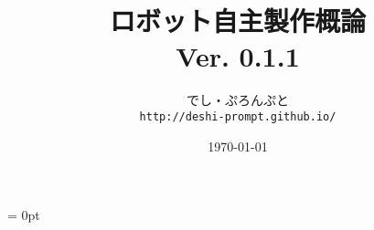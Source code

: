 \documentclass[a4paper,11pt,oneside,openany]{jsbook}
\title{{\Huge \textbf{ロボット自主製作概論}}\\ {\small Ver. 0.1.1}}
\author{でし・ぷろんぷと\\ \texttt{http://deshi-prompt.github.io/}}
\date{\today}
\begin{document}
\parindent = 0pt %

\thispagestyle{empty}

\frontmatter %
\tableofcontents %

\mainmatter %
\end{document}
